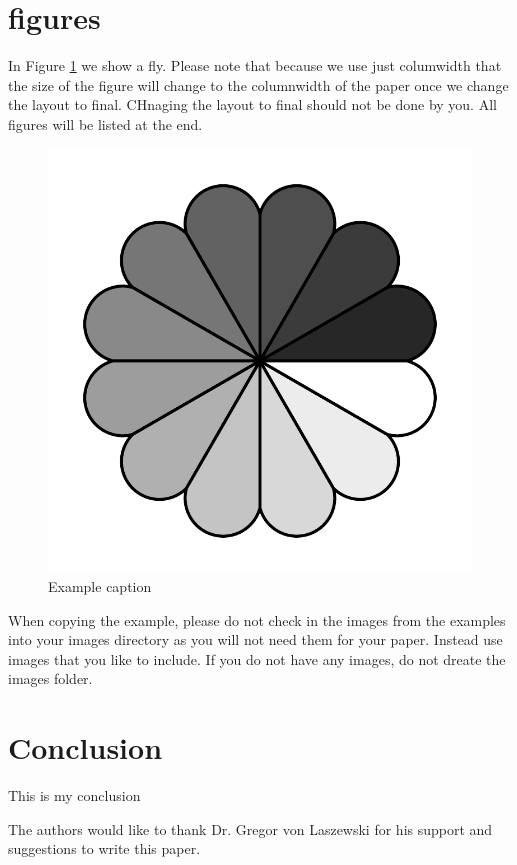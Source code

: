 \documentclass[sigconf]{acmart}
\begin{document}
\section{figures}

In Figure \ref{f:fly} we show a fly. Please note that because we use
just columwidth that the size of the figure will change to the
columnwidth of the paper once we change the layout to final. CHnaging
the layout to final should not be done by you. All figures will be
listed at the end.

\begin{figure}[!ht]
  \centering\includegraphics[width=\columnwidth]{images/rosette.pdf}
  \caption{Example caption}\label{f:fly}
\end{figure}

When copying the example, please do not check in the images from the
examples into your images directory as you will not need them for your
paper. Instead use images that you like to include. If you do not have
any images, do not dreate the images folder.

\section{Conclusion}

This is my conclusion

\begin{acks}

  The authors would like to thank Dr. Gregor von Laszewski for his
  support and suggestions to write this paper.

\end{acks}


 

\appendix


\end{document}
